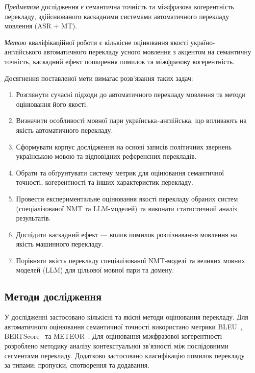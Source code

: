 \textit{Предметом} дослідження є семантична точність та міжфразова когерентність
перекладу, здійснюваного каскадними системами автоматичного перекладу мовлення
(ASR + MT).

\textit{Метою} кваліфікаційної роботи є кількісне оцінювання якості
україно-англійського автоматичного перекладу усного мовлення з акцентом на
семантичну точність, каскадний ефект поширення помилок та міжфразову
когерентність.

Досягнення поставленої мети вимагає розв'язання таких задач:
\begin{enumerate}[nosep]
    \item Розглянути сучасні підходи до автоматичного перекладу мовлення
    та методи оцінювання його якості.
    \item Визначити особливості мовної пари українська--англійська, що впливають
    на якість автоматичного перекладу.
    \item Сформувати корпус дослідження на основі записів політичних звернень
    українською мовою та відповідних референсних перекладів.
    \item Обрати та обґрунтувати систему метрик для оцінювання семантичної
    точності, когерентності та інших характеристик перекладу.
    \item Провести експериментальне оцінювання якості перекладу обраних систем
    (спеціалізованої NMT та LLM-моделей) та виконати статистичний аналіз
    результатів.
    \item Дослідити каскадний ефект --- вплив помилок розпізнавання мовлення
    на якість машинного перекладу.
    \item Порівняти якість перекладу спеціалізованої NMT-моделі та великих
    мовних моделей (LLM) для цільової мовної пари та домену.
\end{enumerate}

\subsection{Методи дослідження}

У дослідженні застосовано кількісні та якісні методи оцінювання перекладу.
Для автоматичного оцінювання семантичної точності використано метрики
BLEU~\cite{papineni_bleu}, BERTScore~\cite{bert_score}
та METEOR~\cite{banerjee_meteor}. Для оцінювання міжфразової когерентності розроблено
методику аналізу контекстуальної зв'язності між послідовними сегментами
перекладу. Додатково застосовано класифікацію помилок перекладу за типами:
пропуски, спотворення та додавання.

